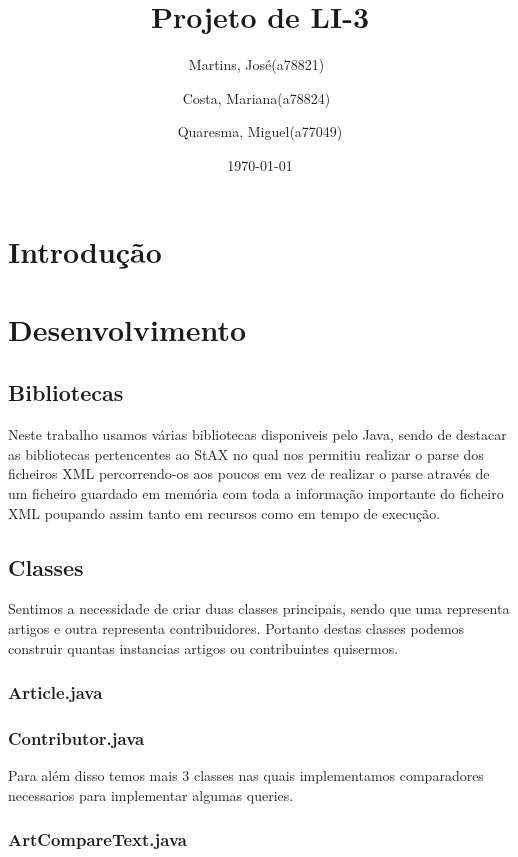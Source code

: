 \documentclass[a4paper,12pt,portuguese]{report}
\title{Projeto de LI-3}
\author{Martins, José(a78821)\
        \and
        Costa, Mariana(a78824)\
        \and
        Quaresma, Miguel(a77049)
        }
\date{\today}
\begin{document}
\begin{titlepage}
\maketitle
\end{titlepage}

\tableofcontents

\chapter{Introdução}

\chapter{Desenvolvimento}

\section{Bibliotecas}
Neste trabalho usamos várias bibliotecas disponiveis pelo Java, sendo de destacar as bibliotecas pertencentes ao StAX no qual nos permitiu realizar o parse dos ficheiros XML percorrendo-os aos poucos em vez de realizar o parse através de um ficheiro guardado em memória com toda a informação importante do ficheiro XML poupando assim tanto em recursos como em tempo de execução. 

\section{Classes}
Sentimos a necessidade de criar duas classes principais, sendo que uma representa artigos e outra representa contribuidores. Portanto destas classes podemos construir quantas instancias artigos ou contribuintes quisermos. 

\subsection{Article.java}

\subsection{Contributor.java}


Para além disso temos mais 3 classes nas quais implementamos comparadores necessarios para implementar algumas queries. 

\subsection{ArtCompareText.java}
\end{document}
